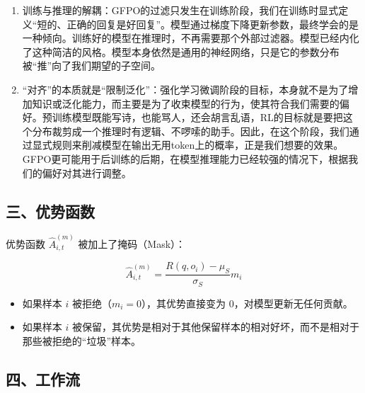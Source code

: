 \begin{enumerate}
\def\labelenumi{\arabic{enumi}.}
\item
  训练与推理的解耦：GFPO的过滤只发生在训练阶段，我们在训练时显式定义``短的、正确的回复是好回复''。模型通过梯度下降更新参数，最终学会的是一种倾向。训练好的模型在推理时，不再需要那个外部过滤器。模型已经内化了这种简洁的风格。模型本身依然是通用的神经网络，只是它的参数分布被``推''向了我们期望的子空间。
\item
  ``对齐''的本质就是``限制泛化''：强化学习微调阶段的目标，本身就不是为了增加知识或泛化能力，而主要是为了收束模型的行为，使其符合我们需要的偏好。预训练模型既能写诗，也能骂人，还会胡言乱语，RL的目标就是要把这个分布裁剪成一个推理时有逻辑、不啰嗦的助手。因此，在这个阶段，我们通过显式规则来削减模型在输出无用token上的概率，正是我们想要的效果。GFPO更可能用于后训练的后期，在模型推理能力已经较强的情况下，根据我们的偏好对其进行调整。
\end{enumerate}

\hypertarget{ux4e09ux4f18ux52bfux51fdux6570}{%
\subsection{三、优势函数}\label{ux4e09ux4f18ux52bfux51fdux6570}}

优势函数 \(\hat{A}_{i,t}^{(m)}\) 被加上了掩码（Mask）：

\[
\hat{A}_{i,t}^{(m)} = \frac{R(q,o_i)-\mu_S}{\sigma_S} m_i
\]

\begin{itemize}
\tightlist
\item
  如果样本 \(i\) 被拒绝（\(m_i=0\)），其优势直接变为 \(0\)，对模型更新无任何贡献。
\item
  如果样本 \(i\) 被保留，其优势是相对于其他保留样本的相对好坏，而不是相对于那些被拒绝的``垃圾''样本。
\end{itemize}

\hypertarget{ux56dbux5de5ux4f5cux6d41}{%
\subsection{四、工作流}\label{ux56dbux5de5ux4f5cux6d41}}

